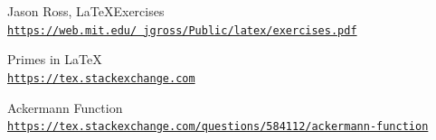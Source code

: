 \documentclass[a4paper]{article}
\begin{document}
\newpage
\begin{thebibliography}{9}	
	Jason Ross, \LaTeX Exercises
	\\\href{https://web.mit.edu/~jgross/Public/latex/exercises.pdf}{ \texttt{https://web.mit.edu/~jgross/Public/latex/exercises.pdf}}
	
	Primes in \LaTeX
	\\\href{https://tex.stackexchange.com/questions/134305/how-to-produce-a-list-of-prime-numbers-in-latex}{\texttt{https://tex.stackexchange.com}}
	
	Ackermann Function
	\\\href{https://tex.stackexchange.com/questions/584112/ackermann-function}
	{\texttt{https://tex.stackexchange.com/questions/584112/ackermann-function}}

\end{thebibliography}
\end{document}
